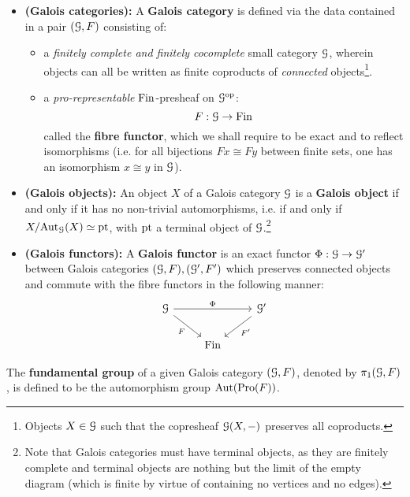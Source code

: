         \begin{definition} \label{def: galois_categories}
            \noindent
            \begin{itemize}
                \item \textbf{(Galois categories):} A \textbf{Galois category} is defined via the data contained in a pair $(\mathcal{G}, F)$ consisting of:
                \begin{itemize}
                    \item a \textit{finitely complete and finitely cocomplete} small category $\mathcal{G}$, wherein objects can all be written as finite coproducts of \textit{connected} objects\footnote{Objects $X \in \mathcal{G}$ such that the copresheaf $\mathcal{G}(X, -)$ preserves all coproducts.}.
                    \item a \textit{pro-representable} $\mathrm{Fin}$-presheaf on $\mathcal{G}^{\mathrm{op}}$:
                        $$F: \mathcal{G} \to \mathrm{Fin}$$
                    called the \textbf{fibre functor}, which we shall require to be exact and to reflect isomorphisms (i.e. for all bijections $Fx \cong Fy$ between finite sets, one has an isomorphism $x \cong y$ in $\mathcal{G}$).
                \end{itemize}
                \item \textbf{(Galois objects):} An object $X$ of a Galois category $\mathcal{G}$ is a \textbf{Galois object} if and only if it has no non-trivial automorphisms, i.e. if and only if $X/\mathrm{Aut}_{\mathcal{G}}(X) \simeq \mathrm{pt}$, with $\mathrm{pt}$ a terminal object of $\mathcal{G}$.\footnote{Note that Galois categories must have terminal objects, as they are finitely complete and terminal objects are nothing but the limit of the empty diagram (which is finite by virtue of containing no vertices and no edges).}
                \item \textbf{(Galois functors):} A \textbf{Galois functor} is an exact functor $\Phi: \mathcal{G} \to \mathcal{G}'$ between Galois categories $(\mathcal{G}, F), (\mathcal{G}', F')$ which preserves connected objects and commute with the fibre functors in the following manner:
                    $$
                        \begin{tikzcd}
                        	\calG && {\calG'} \\
                        	& \Fin
                        	\arrow["F"', from=1-1, to=2-2]
                        	\arrow["{F'}", from=1-3, to=2-2]
                        	\arrow["\Phi", from=1-1, to=1-3]
                        \end{tikzcd}
                    $$
            \end{itemize}
        \end{definition}
        \begin{definition} \label{def: fundamental_groups_of_galois_categories}
            The \textbf{fundamental group} of a given Galois category $(\mathcal{G}, F)$, denoted by $\pi_1(\mathcal{G}, F)$, is defined to be the automorphism group $\mathrm{Aut}(\mathrm{Pro}(F))$.
        \end{definition}
        
